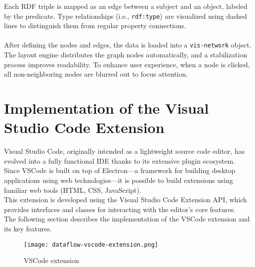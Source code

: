Each RDF triple is mapped as an edge between a subject and an object, labeled by the predicate.  
Type relationships (i.e., \texttt{rdf:type}) are visualized using dashed lines to distinguish them from regular property connections.
\\
\\
After defining the nodes and edges, the data is loaded into a \texttt{vis-network} object.  
The layout engine distributes the graph nodes automatically, and a stabilization process improves readability.  
To enhance user experience, when a node is clicked, all non-neighboring nodes are blurred out to focus attention.

\section{Implementation of the Visual Studio Code Extension}    

Visual Studio Code, originally intended as a lightweight source code editor, has evolved into a fully functional IDE thanks to its extensive plugin ecosystem.
\\
Since VSCode is built on top of Electron—a framework for building desktop applications using web technologies—it is possible to build extensions using familiar web tools (HTML, CSS, JavaScript).
\\
This extension is developed using the Visual Studio Code Extension API, which provides interfaces and classes for interacting with the editor’s core features.
\\
The following section describes the implementation of the VSCode extension and its key features.

\begin{figure}[htb]
    \centering
    \texttt{[image: dataflow-vscode-extension.png]}
    \caption{VSCode extension}
    \label{fig:vscode-extension}
\end{figure}

